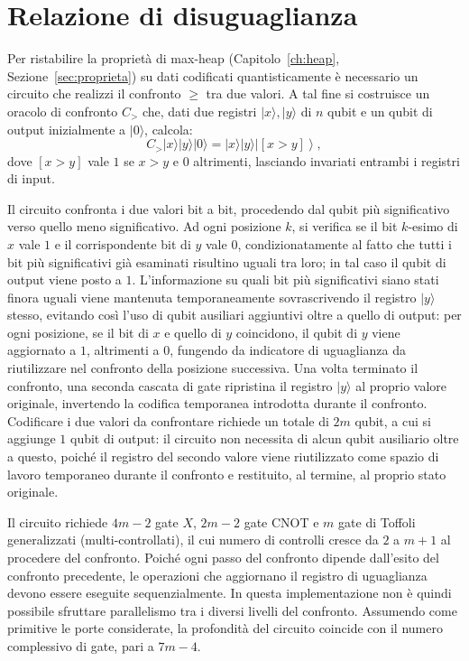 \section{Relazione di disuguaglianza \label{sec:disuguaglianza}}
Per ristabilire la proprietà di max-heap (Capitolo~\ref{ch:heap}, Sezione~\ref{sec:proprieta}) su dati codificati quantisticamente è necessario un circuito che realizzi il confronto $\geq$ tra due valori. A tal fine si costruisce un oracolo di confronto $C_>$ che, dati due registri $|x\rangle, |y\rangle$ di $n$ qubit e un qubit di output inizialmente a $|0\rangle$, calcola:
\begin{equation}
  C_> |x\rangle |y\rangle |0\rangle = |x\rangle |y\rangle \left| [x > y] \right\rangle,
\end{equation}
dove $[x > y]$ vale $1$ se $x > y$ e $0$ altrimenti, lasciando invariati entrambi i registri di input.

Il circuito confronta i due valori bit a bit, procedendo dal qubit più significativo verso quello meno significativo. Ad ogni posizione $k$, si verifica se il bit $k$-esimo di $x$ vale $1$ e il corrispondente bit di $y$ vale $0$, condizionatamente al fatto che tutti i bit più significativi già esaminati risultino uguali tra loro; in tal caso il qubit di output viene posto a $1$. L'informazione su quali bit più significativi siano stati finora uguali viene mantenuta temporaneamente sovrascrivendo il registro $|y\rangle$ stesso, evitando così l'uso di qubit ausiliari aggiuntivi oltre a quello di output: per ogni posizione, se il bit di $x$ e quello di $y$ coincidono, il qubit di $y$ viene aggiornato a $1$, altrimenti a $0$, fungendo da indicatore di uguaglianza da riutilizzare nel confronto della posizione successiva. Una volta terminato il confronto, una seconda cascata di gate ripristina il registro $|y\rangle$ al proprio valore originale, invertendo la codifica temporanea introdotta durante il confronto. Codificare i due valori da confrontare richiede un totale di $2m$ qubit, a cui si aggiunge $1$ qubit di output: il circuito non necessita di alcun qubit ausiliario oltre a questo, poiché il registro del secondo valore viene riutilizzato come spazio di lavoro temporaneo durante il confronto e restituito, al termine, al proprio stato originale.

Il circuito richiede $4m - 2$ gate $X$, $2m - 2$ gate CNOT e $m$ gate di Toffoli generalizzati (multi-controllati), il cui numero di controlli cresce da $2$ a $m + 1$ al procedere del confronto. Poiché ogni passo del confronto dipende dall'esito del confronto precedente, le operazioni che aggiornano il registro di uguaglianza devono essere eseguite sequenzialmente. In questa implementazione non è quindi possibile sfruttare parallelismo tra i diversi livelli del confronto. Assumendo come primitive le porte considerate, la profondità del circuito coincide con il numero complessivo di gate, pari a $7m-4$.

